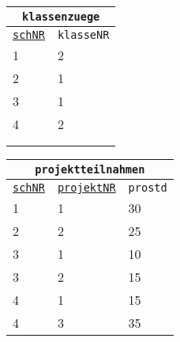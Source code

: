 \begin{Answer}[ref=Normal0]
\begin{minipage}{\textwidth}
\begin{minipage}{0.33\textwidth}
\begin{tabular}{ll}
				\multicolumn{2}{c}{\lstinline!klassenzuege!}\\
				\hline
				\underline{\lstinline!schNR!}&\lstinline!klasseNR!\\
				\hline
				1&2\\
				2&1\\
				3&1\\
				4&2\\
				\phantom{text}&\\
				\phantom{text}&\\
			\end{tabular}
		\end{minipage}
		\begin{minipage}{0.66\textwidth}
			\begin{tabular}{lll}
				\multicolumn{3}{c}{\lstinline!projektteilnahmen!}\\
				\hline
				\underline{\lstinline!schNR!}&\underline{\lstinline!projektNR!}&\lstinline!prostd!\\
				\hline
				1&1&30\\
				2&2&25\\
				3&1&10\\
				3&2&15\\
				4&1&15\\
				4&3&35\\
			\end{tabular}
		\end{minipage}
	\end{minipage}
\end{Answer}
